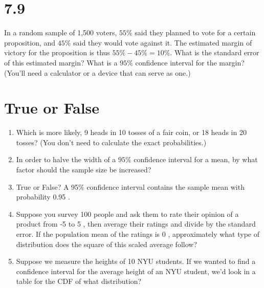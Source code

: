 \documentclass{article}%
\begin{document}
\section{7.9} In a random sample of 1,500 voters, $55 \%$ said they planned to vote for a certain proposition, and $45 \%$ said they would vote against it. The estimated margin of victory for the proposition is thus $55 \%-45 \%=10 \%$. What is the standard error of this estimated margin? What is a $95 \%$ confidence interval for the margin? (You'll need a calculator or a device that can serve as one.)

\section{True or False}

\begin{enumerate}
    \item Which is more likely, 9 heads in 10 tosses of a fair coin, or 18 heads in 20 tosses? (You don't need to calculate the exact probabilities.)
    \item In order to halve the width of a $95 \%$ confidence interval for a mean, by what factor should the sample size be increased?
    \item True or False? A 95\% confidence interval contains the sample mean with probability 0.95 .
    \item Suppose you survey 100 people and ask them to rate their opinion of a product from -5 to 5 , then average their ratings and divide by the standard error. If the population mean of the ratings is 0 , approximately what type of distribution does the square of this scaled average follow?
    \item Suppose we measure the heights of 10 NYU students. If we wanted to find a confidence interval for the average height of an NYU student, we'd look in a table for the CDF of what distribution?
\end{enumerate}


%
%
\end{document}

